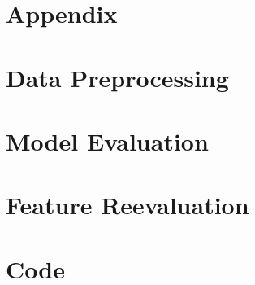 \begin{appendices}
    \section*{Appendix}
    
    \section{Data Preprocessing}
    \section{Model Evaluation}
    \section{Feature Reevaluation}
    \section{Code}
  
\end{appendices}